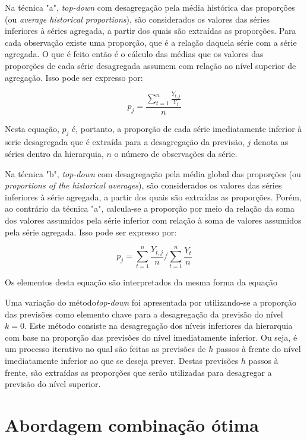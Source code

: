 \documentclass[
	12pt,				%
	openright,			%
	twoside,			%
	a4paper,			%
	english,			%
	french,				%
	spanish,			%
	brazil				%
	]{abntex2}
\begin{document}
Na técnica "a", \emph{top-down} com desagregação pela média histórica das proporções (ou \emph{average historical proportions}), são considerados os valores das séries inferiores à séries agregada, a partir dos quais são extraídas as proporções. Para cada observação existe uma proporção, que é a relação daquela série com a série agregada. O que é feito então é o cálculo das médias que os valores das proporções de cada série desagregada assumem com relação ao nível superior de agregação. Isso pode ser expresso por:

\begin{equation}
p_j = \frac{\sum_{t=1}^{n} \frac{Y_{t,j}}{Y_t}} {n}
\end{equation}

Nesta equação, $p_j$ é, portanto, a proporção de cada série imediatamente inferior à serie desagregada que é extraída para a desagregação da previsão, $j$ denota as séries dentro da hierarquia, $n$ o número de observações da série.

Na técnica "b", \emph{top-down} com desagregação pela média global das proporções (ou \emph{proportions of the historical averages}), são considerados os valores das séries inferiores à série agregada, a partir dos quais são extraídas as proporções. Porém, ao contrário da técnica "a", calcula-se a proporção por meio da relação da soma dos valores assumidos pela série inferior com relação à soma de valores assumidos pela série agregada. Isso pode ser expresso por:

\begin{equation}
p_j = \sum_{t=1}^{n} \frac{Y_{t,j}}{n} / \sum_{t=1}^{n} \frac{Y_{t}}{n}
\end{equation}

Os elementos desta equação são interpretados da mesma forma da equação \cite{2.5}

Uma variação do método\emph{top-down} foi apresentada por  utilizando-se a proporção das previsões como elemento chave para a desagregação da previsão do nível $k=0$. Este método consiste na desagregação dos níveis inferiores da hierarquia com base na proporção das previsões do nível imediatamente inferior. Ou seja, é um processo iterativo no qual são feitas as previsões de $h$ passos à frente do nível imediatamente inferior ao que se deseja prever. Destas previsões $h$ passos à frente, são extraídas as proporções que serão utilizadas para desagregar a previsão do nível superior. 

\section{Abordagem combinação ótima}
\end{document}
